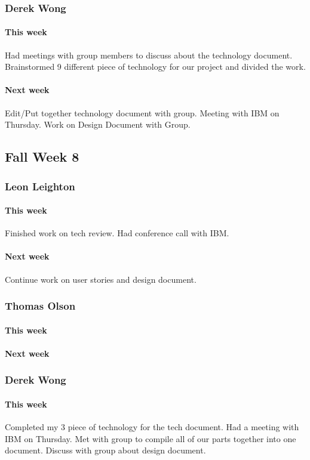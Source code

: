 \documentclass[10pt,letterpaper,onecolumn,draftclsnofoot]{IEEEtran}
\begin{document}
\subsubsection{Derek Wong}
\paragraph{This week}Had meetings with group members to discuss about the technology document.    
Brainstormed 9 different piece of technology for our project and divided the work.
\paragraph{Next week}Edit/Put together technology document with group.                         
Meeting with IBM on Thursday.        
Work on Design Document with Group.

\subsection{Fall Week 8}
\subsubsection{Leon Leighton}
\paragraph{This week}Finished work on tech review. Had conference call with IBM.
\paragraph{Next week}Continue work on user stories and design document.

\subsubsection{Thomas Olson}
\paragraph{This week}
\paragraph{Next week}

\subsubsection{Derek Wong}
\paragraph{This week}Completed my 3 piece of technology for the tech document.                     
Had a meeting with IBM on Thursday.               
Met with group to compile all of our parts together into one document.                
Discuss with group about design document.
\end{document}
